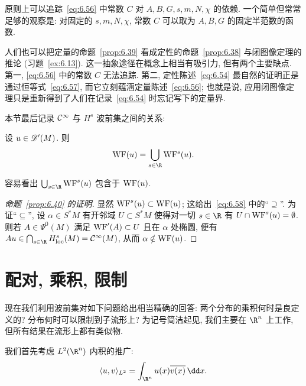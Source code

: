 原则上可以追踪~\eqref{eq:6.56} 中常数 $C$ 对 $A, B, G, s, m, N, \chi$ 的依赖. 一个简单但常常足够的观察是: 对固定的 $s, m, N, \chi$, 常数 $C$ 可以取为 $A, B, G$ 的固定半范数的函数.

人们也可以把定量的命题~\ref{prop:6.39} 看成定性的命题~\ref{prop:6.38} 与闭图像定理的推论 (习题~\ref{ex:6.13}). 这一抽象途径在概念上相当有吸引力, 但有两个主要缺点. 第一, \eqref{eq:6.56} 中的常数 $C$ 无法追踪. 第二, 定性陈述~\eqref{eq:6.54} 最自然的证明正是通过恒等式~\eqref{eq:6.57}, 而它立刻蕴涵定量陈述~\eqref{eq:6.56}; 也就是说, 应用闭图像定理只是重新得到了人们在记录~\eqref{eq:6.54} 时忘记写下的定量界.

本节最后记录 $\mathcal{C}^\infty$ 与 $H^s$ 波前集之间的关系:

\begin{proposition}\label{prop:6.40}
设 $u \in \mathscr{D}'(M)$. 则
\begin{equation}\label{eq:6.58}
    \WF(u) = \bigcup_{s \in \R} \WF^s(u).
\end{equation}
\end{proposition}

容易看出 $\bigcup_{s \in \R} \WF^s(u)$ 包含于 $\operatorname{WF}(u)$.

\begin{proof}[命题~\ref{prop:6.40} 的证明]
显然 $\operatorname{WF}^s(u) \subset \operatorname{WF}(u)$; 这给出~\eqref{eq:6.58} 中的``$\supseteq$''. 为证``$\subseteq$'', 设 $\alpha \in S^* M$ 有开邻域 $U \subset S^* M$ 使得对一切 $s \in \R$ 有 $U \cap \operatorname{WF}^s(u) = \emptyset$. 则若 $A \in \Psi^0(M)$ 满足 $\operatorname{WF}'(A) \subset U$ 且在 $\alpha$ 处椭圆, 便有 $A u \in \bigcap_{s \in \R} H^s_{\mathrm{loc}}(M) = \Smooth(M)$, 从而 $\alpha \notin \operatorname{WF}(u)$.
\end{proof}



\section{配对, 乘积, 限制}\label{sec:6.4}
%
%
%

现在我们利用波前集对如下问题给出相当精确的回答: 两个分布的乘积何时是良定义的? 分布何时可以限制到子流形上? 为记号简洁起见, 我们主要在 $\R^n$ 上工作, 但所有结果在流形上都有类似物.

我们首先考虑 $L^2(\R^n)$ 内积的推广:
\begin{equation}\label{eq:6.59}
    \langle u, v \rangle_{L^2} = \int_{\R^n} u(x) \overline{v(x)} \,\dd x.
\end{equation}

